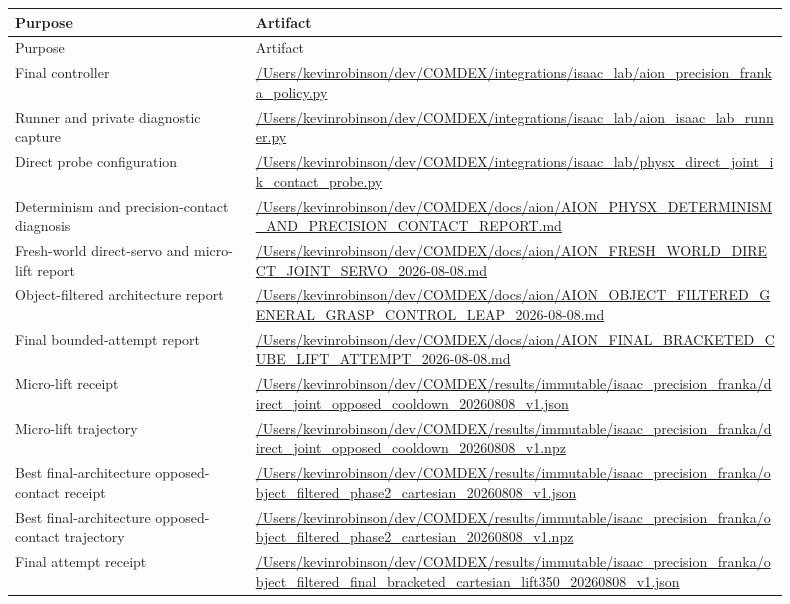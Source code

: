 \begin{longtable}{>{\raggedright\arraybackslash}p{0.28\linewidth}
                  >{\raggedright\arraybackslash}p{0.62\linewidth}}
\toprule
Purpose & Artifact \\
\midrule
\endfirsthead
\toprule
Purpose & Artifact \\
\midrule
\endhead
Final controller &
\url{/Users/kevinrobinson/dev/COMDEX/integrations/isaac_lab/aion_precision_franka_policy.py} \\
Runner and private diagnostic capture &
\url{/Users/kevinrobinson/dev/COMDEX/integrations/isaac_lab/aion_isaac_lab_runner.py} \\
Direct probe configuration &
\url{/Users/kevinrobinson/dev/COMDEX/integrations/isaac_lab/physx_direct_joint_ik_contact_probe.py} \\
Determinism and precision-contact diagnosis &
\url{/Users/kevinrobinson/dev/COMDEX/docs/aion/AION_PHYSX_DETERMINISM_AND_PRECISION_CONTACT_REPORT.md} \\
Fresh-world direct-servo and micro-lift report &
\url{/Users/kevinrobinson/dev/COMDEX/docs/aion/AION_FRESH_WORLD_DIRECT_JOINT_SERVO_2026-08-08.md} \\
Object-filtered architecture report &
\url{/Users/kevinrobinson/dev/COMDEX/docs/aion/AION_OBJECT_FILTERED_GENERAL_GRASP_CONTROL_LEAP_2026-08-08.md} \\
Final bounded-attempt report &
\url{/Users/kevinrobinson/dev/COMDEX/docs/aion/AION_FINAL_BRACKETED_CUBE_LIFT_ATTEMPT_2026-08-08.md} \\
Micro-lift receipt &
\url{/Users/kevinrobinson/dev/COMDEX/results/immutable/isaac_precision_franka/direct_joint_opposed_cooldown_20260808_v1.json} \\
Micro-lift trajectory &
\url{/Users/kevinrobinson/dev/COMDEX/results/immutable/isaac_precision_franka/direct_joint_opposed_cooldown_20260808_v1.npz} \\
Best final-architecture opposed-contact receipt &
\url{/Users/kevinrobinson/dev/COMDEX/results/immutable/isaac_precision_franka/object_filtered_phase2_cartesian_20260808_v1.json} \\
Best final-architecture opposed-contact trajectory &
\url{/Users/kevinrobinson/dev/COMDEX/results/immutable/isaac_precision_franka/object_filtered_phase2_cartesian_20260808_v1.npz} \\
Final attempt receipt &
\url{/Users/kevinrobinson/dev/COMDEX/results/immutable/isaac_precision_franka/object_filtered_final_bracketed_cartesian_lift350_20260808_v1.json} \\

\end{longtable}
